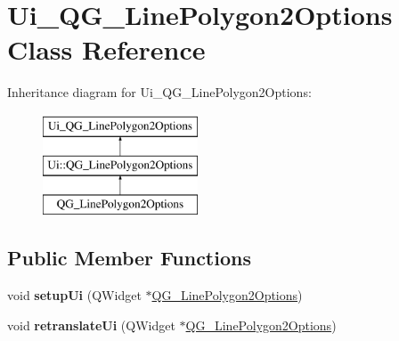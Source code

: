 \hypertarget{classUi__QG__LinePolygon2Options}{\section{Ui\-\_\-\-Q\-G\-\_\-\-Line\-Polygon2\-Options Class Reference}
\label{classUi__QG__LinePolygon2Options}
}
Inheritance diagram for Ui\-\_\-\-Q\-G\-\_\-\-Line\-Polygon2\-Options\-:\begin{figure}[H]
\begin{center}
\leavevmode
\includegraphics[height=3.000000cm]{classUi__QG__LinePolygon2Options}
\end{center}
\end{figure}
\subsection*{Public Member Functions}
\begin{DoxyCompactItemize}
\item 
\hypertarget{classUi__QG__LinePolygon2Options_aa22a8a0abc67e6539398c4e0d94a4a4e}{void {\bfseries setup\-Ui} (Q\-Widget $\ast$\hyperlink{classQG__LinePolygon2Options}{Q\-G\-\_\-\-Line\-Polygon2\-Options})}\label{classUi__QG__LinePolygon2Options_aa22a8a0abc67e6539398c4e0d94a4a4e}

\item 
\hypertarget{classUi__QG__LinePolygon2Options_aec816b3de273436fe52ad7cf66548714}{void {\bfseries retranslate\-Ui} (Q\-Widget $\ast$\hyperlink{classQG__LinePolygon2Options}{Q\-G\-\_\-\-Line\-Polygon2\-Options})}\label{classUi__QG__LinePolygon2Options_aec816b3de273436fe52ad7cf66548714}

\end{DoxyCompactItemize}
